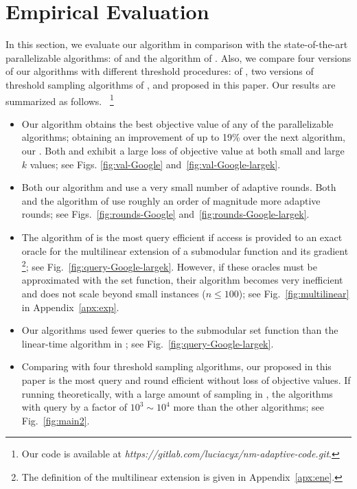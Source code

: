 \section{Empirical Evaluation} \label{sec:exp}
In this section, we evaluate our algorithm in comparison
with the state-of-the-art parallelizable algorithms: 
\anm of  and the algorithm of .
Also, we compare four versions of our algorithms
with different threshold procedures: \thresam of , 
two versions of threshold sampling algorithms of ,
and \threseq proposed in this paper.
Our results are summarized as follows.
~\footnote{Our code is available at 
\textit{https://gitlab.com/luciacyx/nm-adaptive-code.git}.}
\begin{itemize}
\item Our algorithm \latg obtains the best objective
value of any of the parallelizable algorithms;
obtaining an improvement of up to 19\% over the next algorithm,
our \atg. Both  and  exhibit
a large loss of objective value at both small and large $k$ values; see Figs.
\ref{fig:val-Google} and~\ref{fig:val-Google-largek}.
\item Both our algorithm \atg and \anm use a very small number
of adaptive rounds. Both \latg and the algorithm of 
use roughly an order of magnitude more adaptive rounds; see
Figs.~\ref{fig:rounds-Google} and~\ref{fig:rounds-Google-largek}.
\item The algorithm of  is the most query efficient if access
is provided to an exact oracle 
for the multilinear extension of a submodular function and its gradient
\footnote{The definition of the multilinear extension is given in Appendix~\ref{apx:ene}.};
see Fig.~\ref{fig:query-Google-largek}.
However, if these oracles must be approximated with the set function, 
their algorithm becomes very inefficient and does not scale 
beyond small instances ($n \le 100$); 
see Fig.~\ref{fig:multilinear} in Appendix~\ref{apx:exp}. 
\item Our algorithms used fewer queries to the submodular set function 
than the linear-time algorithm \frg
in ; see Fig.~\ref{fig:query-Google-largek}.
\item Comparing \atg with four threshold sampling algorithms, 
our \threseq proposed in this paper is the most 
query and round efficient without loss of objective values. 
If running \thresam theoretically, 
with a large amount of sampling in \reducedmean,
the algorithms with \thresam query by a factor of $10^3\sim 10^4$
more than the other algorithms;
see Fig.~\ref{fig:main2}.
\end{itemize}

